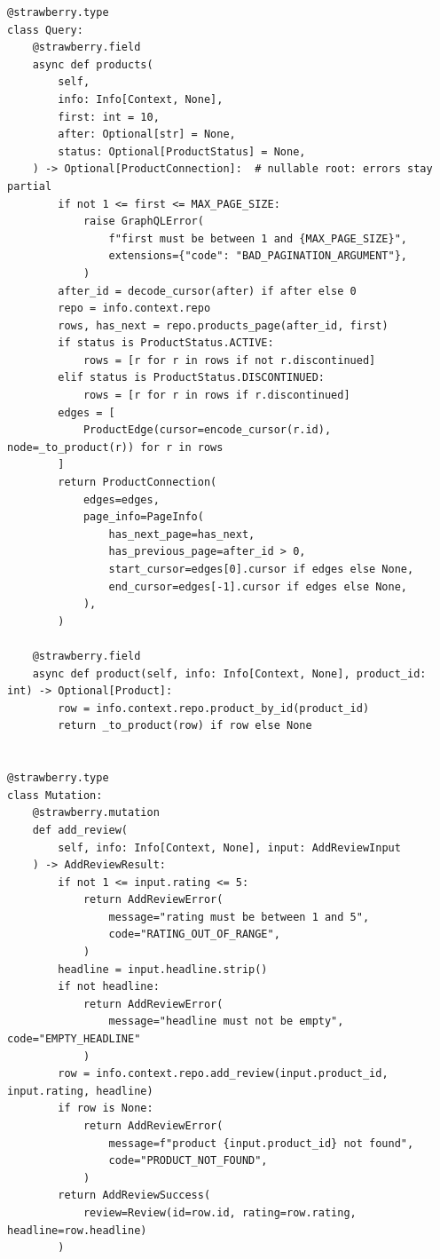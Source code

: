 \begin{verbatim}
@strawberry.type
class Query:
    @strawberry.field
    async def products(
        self,
        info: Info[Context, None],
        first: int = 10,
        after: Optional[str] = None,
        status: Optional[ProductStatus] = None,
    ) -> Optional[ProductConnection]:  # nullable root: errors stay partial
        if not 1 <= first <= MAX_PAGE_SIZE:
            raise GraphQLError(
                f"first must be between 1 and {MAX_PAGE_SIZE}",
                extensions={"code": "BAD_PAGINATION_ARGUMENT"},
            )
        after_id = decode_cursor(after) if after else 0
        repo = info.context.repo
        rows, has_next = repo.products_page(after_id, first)
        if status is ProductStatus.ACTIVE:
            rows = [r for r in rows if not r.discontinued]
        elif status is ProductStatus.DISCONTINUED:
            rows = [r for r in rows if r.discontinued]
        edges = [
            ProductEdge(cursor=encode_cursor(r.id), node=_to_product(r)) for r in rows
        ]
        return ProductConnection(
            edges=edges,
            page_info=PageInfo(
                has_next_page=has_next,
                has_previous_page=after_id > 0,
                start_cursor=edges[0].cursor if edges else None,
                end_cursor=edges[-1].cursor if edges else None,
            ),
        )

    @strawberry.field
    async def product(self, info: Info[Context, None], product_id: int) -> Optional[Product]:
        row = info.context.repo.product_by_id(product_id)
        return _to_product(row) if row else None


@strawberry.type
class Mutation:
    @strawberry.mutation
    def add_review(
        self, info: Info[Context, None], input: AddReviewInput
    ) -> AddReviewResult:
        if not 1 <= input.rating <= 5:
            return AddReviewError(
                message="rating must be between 1 and 5",
                code="RATING_OUT_OF_RANGE",
            )
        headline = input.headline.strip()
        if not headline:
            return AddReviewError(
                message="headline must not be empty", code="EMPTY_HEADLINE"
            )
        row = info.context.repo.add_review(input.product_id, input.rating, headline)
        if row is None:
            return AddReviewError(
                message=f"product {input.product_id} not found",
                code="PRODUCT_NOT_FOUND",
            )
        return AddReviewSuccess(
            review=Review(id=row.id, rating=row.rating, headline=row.headline)
        )



\end{verbatim}
